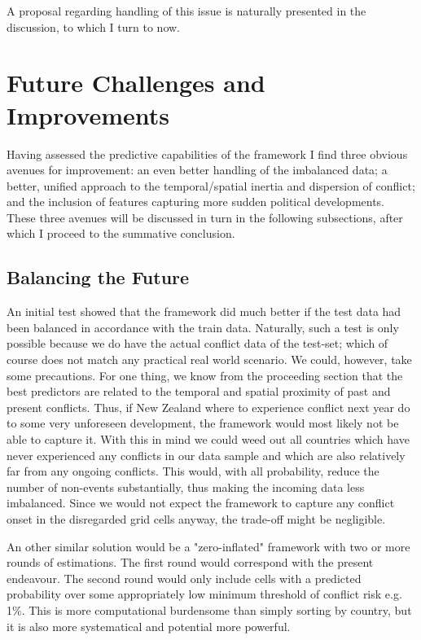 \documentclass[a4paper]{article}
\begin{document}

A proposal regarding handling of this issue is naturally presented in the discussion, to which I turn to now.\par

\section{Future Challenges and Improvements}

Having assessed the predictive capabilities of the framework I find three obvious avenues for improvement: an even better handling of the imbalanced data; a better, unified approach to the temporal/spatial inertia and dispersion of conflict; and the inclusion of features capturing more sudden political developments. These three avenues will be discussed in turn in the following subsections, after which I proceed to the summative conclusion.

\subsection{Balancing the Future}
An initial test showed that the framework did much better if the test data had been balanced in accordance with the train data. Naturally, such a test is only possible because we do have the actual conflict data of the test-set; which of course does not match any practical real world scenario. We could, however, take some precautions. For one thing, we know from the proceeding section that the best predictors are related to the temporal and spatial proximity of past and present conflicts. Thus, if New Zealand where to experience conflict next year do to some very unforeseen development, the framework would most likely not be able to capture it. With this in mind we could weed out all countries which have never experienced any conflicts in our data sample and which are also relatively far from any ongoing conflicts. This would, with all probability, reduce the number of non-events substantially, thus making the incoming data less imbalanced. Since we would not expect the framework to capture any conflict onset in the disregarded grid cells anyway, the trade-off might be negligible.\par

An other similar solution would be a "zero-inflated" framework with two or more rounds of estimations. The first round would correspond with the present endeavour. The second round would only include cells with a predicted probability over some appropriately low minimum threshold of conflict risk e.g. 1\%. This is more computational burdensome than simply sorting by country, but it is also more systematical and potential more powerful.\par  
\end{document}
